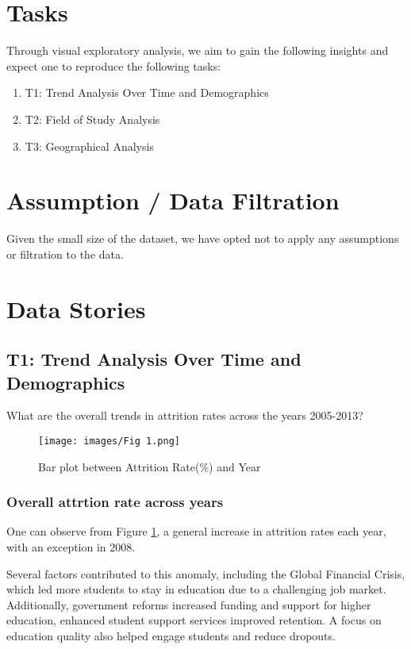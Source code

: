 \documentclass[conference]{IEEEtran}
\begin{document}
\section{Tasks}
\indent Through visual exploratory analysis, we aim to gain the following insights and expect one to reproduce the following tasks:

\begin{enumerate}[leftmargin=2em, itemsep=0.05em, topsep=0.05em]    
   \item {T1:} Trend Analysis Over Time and Demographics 
   \item {T2:} Field of Study Analysis 
   \item {T3:} Geographical Analysis
\end{enumerate}

\section{Assumption / Data Filtration}

\indent Given the small size of the dataset, we have opted not to apply any assumptions or filtration to the data.

\section{Data Stories}


\subsection{T1: Trend Analysis Over Time and Demographics}

 What are the overall trends in attrition rates across the years 2005-2013?

\begin{figure}[H]
    \centering
    \texttt{[image: images/Fig 1.png]}
    \caption{Bar plot between Attrition Rate(\%) and Year}
    \label{fig:bar1}
\end{figure}

\subsubsection{Overall attrtion rate across years}
One can observe from Figure \ref{fig:bar1}, a general increase in attrition rates each year, with an exception in 2008. \par Several factors contributed to this anomaly, including the Global Financial Crisis, which led more students to stay in education due to a challenging job market. Additionally, government reforms increased funding and support for higher education, enhanced student support services improved retention. A focus on education quality also helped engage students and reduce dropouts.
\end{document}
